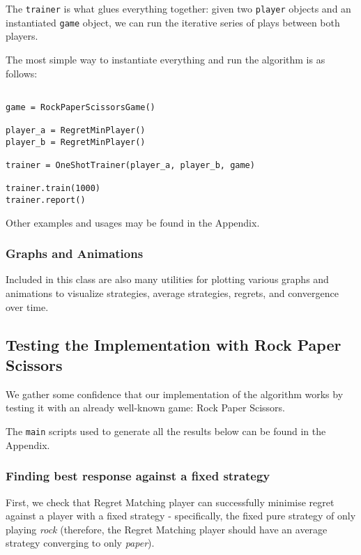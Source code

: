 \documentclass [11pt]{article}
\begin{document}
The \texttt{trainer} is what glues everything together: given two \texttt{player} objects and an instantiated \texttt{game} object, we can run the iterative series of plays between both players.

The most simple way to instantiate everything and run the algorithm is as follows:

\begin{verbatim}

game = RockPaperScissorsGame()

player_a = RegretMinPlayer()
player_b = RegretMinPlayer()

trainer = OneShotTrainer(player_a, player_b, game)

trainer.train(1000)
trainer.report()

\end{verbatim}

Other examples and usages may be found in the Appendix.

\subsubsection{Graphs and Animations}

Included in this class are also many utilities for plotting various graphs and animations to visualize strategies, average strategies, regrets, and convergence over time.

\subsection{Testing the Implementation with Rock Paper Scissors}

We gather some confidence that our implementation of the algorithm works by testing it with an already well-known game: Rock Paper Scissors.

The \texttt{main} scripts used to generate all the results below can be found in the Appendix.

\subsubsection{Finding best response against a fixed strategy}

First, we check that Regret Matching player can successfully minimise regret against a player with a fixed strategy - specifically, the fixed pure strategy of only playing \textit{rock} (therefore, the Regret Matching player should have an average strategy converging to only \textit{paper}).
\end{document}
